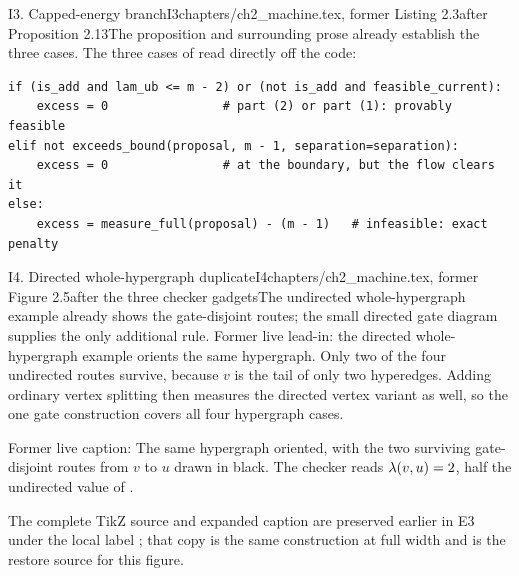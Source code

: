\begin{offcut}{I3. Capped-energy branch}{I3}{chapters/ch2\_machine.tex, former Listing 2.3}{after Proposition 2.13}{The proposition and surrounding prose already establish the three cases.}
The three cases of  read directly off the code:

\begin{lstlisting}[caption={The three cases behind \Cref{prop:monotone}, in the order the proof gives them: removal from a feasible graph (part 1), addition below the bound (part 2), and only otherwise a single capped flow.}, label={offcut:lst:capped-energy}]
if (is_add and lam_ub <= m - 2) or (not is_add and feasible_current):
    excess = 0                # part (2) or part (1): provably feasible
elif not exceeds_bound(proposal, m - 1, separation=separation):
    excess = 0                # at the boundary, but the flow clears it
else:
    excess = measure_full(proposal) - (m - 1)   # infeasible: exact penalty
\end{lstlisting}
\end{offcut}

\begin{offcut}{I4. Directed whole-hypergraph duplicate}{I4}{chapters/ch2\_machine.tex, former Figure 2.5}{after the three checker gadgets}{The undirected whole-hypergraph example already shows the gate-disjoint routes; the small directed gate diagram supplies the only additional rule.}
Former live lead-in: the directed whole-hypergraph example orients the same hypergraph. Only two of the four undirected routes survive, because $v$ is the tail of only two hyperedges. Adding ordinary vertex splitting then measures the directed vertex variant as well, so the one gate construction covers all four hypergraph cases.

Former live caption: The same hypergraph oriented, with the two surviving gate-disjoint routes from $v$ to $u$ drawn in black. The checker reads $\lambda(v,u)=2$, half the undirected value of .

The complete TikZ source and expanded caption are preserved earlier in E3 under the local label ; that copy is the same construction at full width and is the restore source for this figure.
\end{offcut}

